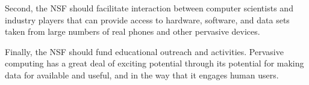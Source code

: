 \begin{flushenumbf}
Second, the NSF should facilitate interaction between computer scientists and
industry players that can provide access to hardware, software, and data sets
taken from large numbers of real phones and other pervasive devices.

Finally, the NSF should fund educational outreach and activities. Pervasive
computing has a great deal of exciting potential through its potential for
making data for available and useful, and in the way that it engages human
users.

\end{flushenumbf}
